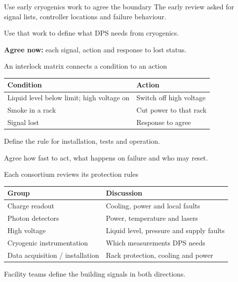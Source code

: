\documentclass[aspectratio=169,11pt]{beamer}
\begin{document}
\begin{frame}{Use early cryogenics work to agree the boundary}
  \large
  The early review asked for signal lists, controller locations and failure behaviour.\par
  \bigskip
  Use that work to define what DPS needs from cryogenics.\par
  \bigskip
  \textbf{Agree now:} each signal, action and response to lost status.
  \bigskip
  \par{}
  \par{}
\end{frame}

\begin{frame}{An interlock matrix connects a condition to an action}
  \renewcommand{\arraystretch}{1.6}
  \begin{tabularx}{\textwidth}{@{}>{\RaggedRight\arraybackslash}X>{\RaggedRight\arraybackslash}X@{}}
    \toprule
    \textbf{Condition} & \textbf{Action}\\
    \midrule
    Liquid level below limit; high voltage on & Switch off high voltage\\
    Smoke in a rack & Cut power to that rack\\
    Signal lost & Response to agree\\
    \bottomrule
  \end{tabularx}\par
  \bigskip
  Define the rule for installation, tests and operation.\par
  \medskip
  Agree how fast to act, what happens on failure and who may reset.
  \bigskip
  \par{}
\end{frame}

\begin{frame}{Each consortium reviews its protection rules}
  \renewcommand{\arraystretch}{1.45}
  \begin{tabularx}{\textwidth}{@{}l>{\RaggedRight\arraybackslash}X@{}}
    \textbf{Group} & \textbf{Discussion}\\
    \midrule
    Charge readout & Cooling, power and local faults\\
    Photon detectors & Power, temperature and lasers\\
    High voltage & Liquid level, pressure and supply faults\\
    Cryogenic instrumentation & Which measurements DPS needs\\
    Data acquisition / installation & Rack protection, cooling and power\\
  \end{tabularx}\par
  \bigskip
  Facility teams define the building signals in both directions.
  \medskip
  \par{}
\end{frame}
\end{document}
